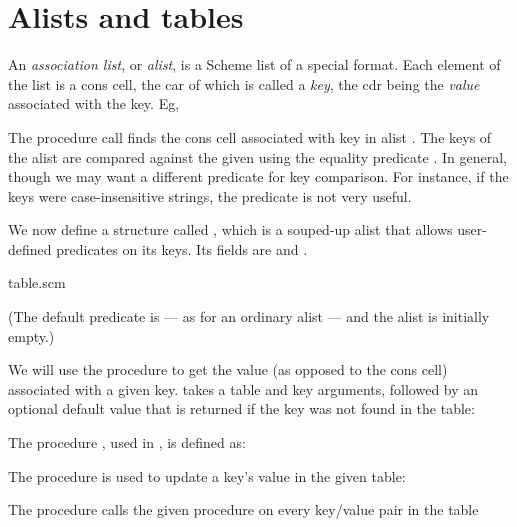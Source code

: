 \chapter{Alists and tables}

An {\em association list}, or {\em alist}, is a Scheme
list of a special format.  Each element of the list is
a cons cell, the car of which is called a {\em key},
the cdr being the {\em value} associated with the key.
Eg,



The procedure call  finds the cons cell
associated with key  in alist .  The keys of
the alist are compared against the given  using
the equality predicate .  In general, though we
may want a different predicate for key comparison.  For
instance, if the keys were case-insensitive strings,
the predicate  is not very useful.


We now define a structure called , which is a
souped-up alist that allows user-defined predicates on
its keys.  Its fields are  and .

\scmfilename table.scm



\n (The default predicate is  --- as for an
ordinary alist --- and the alist is initially empty.)

We will use the procedure  to get the
value (as opposed to the cons cell) associated with a
given key.   takes a table and key
arguments, followed by an optional default value that
is returned if the key was not found in the table:


The procedure , used in , is
defined as:


The procedure  is used to update a key's
value in the given table:


The procedure  calls the given
procedure on every key/value pair in the table





